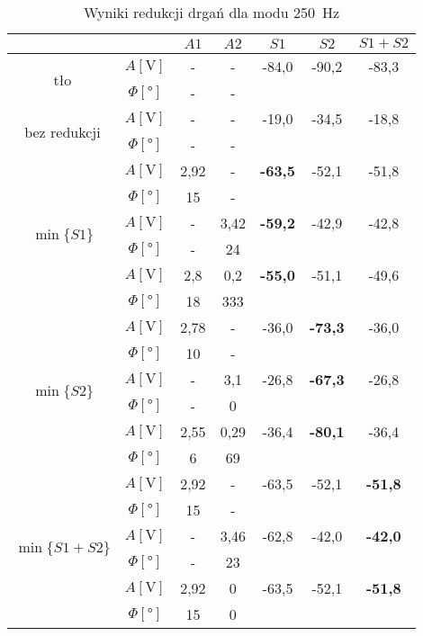 \documentclass[polish,a4paper,11pt]{mwart}
\begin{document}
\begin{table}[!tbh]
  \centering
  \caption{Wyniki redukcji drgań dla modu \SI{250}{\hertz}}
  \label{tab:red1}
  \begin{tabular}{|c|c|c|c|c|c|c|}
    \cline{3-7}
    \multicolumn{2}{c|}{}&$A1$&$A2$&$S1$&$S2$&$S1+S2$\\\hline
    \multirow{2}{*}{tło}               &   $A [\si{\V}]$ & - & - & -84,0 & -90,2 & -83,3 \\\cline{2-7}
				       &$\Phi [\si{\degree}]$ & - & - & \multicolumn{3}{c}{}\\\hline
    \multirow{2}{*}{bez redukcji} &   $A [\si{\V}]$ & - & - & -19,0 & -34,5 & -18,8 \\\cline{2-7}
				       &$\Phi [\si{\degree}]$ & - & - & \multicolumn{3}{c}{}\\\hline
    \multirow{6}{*}{$\min\{S1\}$}      &   $A [\si{\V}]$ & 2,92 & - & \textbf{-63,5} & -52,1 & -51,8 \\\cline{2-7}
				       &$\Phi [\si{\degree}]$ & 15 & - & \multicolumn{3}{c}{}\\\cline{2-7}
				       &   $A [\si{\V}]$ & - & 3,42 & \textbf{-59,2} & -42,9 & -42,8 \\\cline{2-7}
				       &$\Phi [\si{\degree}]$ & - & 24 & \multicolumn{3}{c}{}\\\cline{2-7}
				       &   $A [\si{\V}]$ & 2,8 & 0,2 & \textbf{-55,0} & -51,1 & -49,6 \\\cline{2-7}
				       &$\Phi [\si{\degree}]$ & 18 & 333 & \multicolumn{3}{c}{}\\\hline
    \multirow{6}{*}{$\min\{S2\}$}      &   $A [\si{\V}]$ & 2,78 & - & -36,0 & \textbf{-73,3} & -36,0\\\cline{2-7}
				       &$\Phi [\si{\degree}]$ & 10 & - & \multicolumn{3}{c}{}\\\cline{2-7}
				       &   $A [\si{\V}]$ & - & 3,1 & -26,8 & \textbf{-67,3} & -26,8 \\\cline{2-7}
				       &$\Phi [\si{\degree}]$ & - & 0 & \multicolumn{3}{c}{}\\\cline{2-7}
				       &   $A [\si{\V}]$ & 2,55 & 0,29 & -36,4 & \textbf{-80,1} & -36,4 \\\cline{2-7}
				       &$\Phi [\si{\degree}]$ & 6 & 69 & \multicolumn{3}{c}{}\\\hline
    \multirow{6}{*}{$\min\{S1+S2\}$}   &   $A [\si{\V}]$ & 2,92 & - & -63,5  & -52,1 & \textbf{-51,8}\\\cline{2-7}
				       &$\Phi [\si{\degree}]$ & 15 & - & \multicolumn{3}{c}{}\\\cline{2-7}
				       &   $A [\si{\V}]$ & - & 3,46 & -62,8 & -42,0 & \textbf{-42,0} \\\cline{2-7}
				       &$\Phi [\si{\degree}]$ & - & 23 & \multicolumn{3}{c}{}\\\cline{2-7}
				       &   $A [\si{\V}]$ & 2,92 & 0 & -63,5 & -52,1 & \textbf{-51,8} \\\cline{2-7}
				       &$\Phi [\si{\degree}]$ & 15 & 0 & \multicolumn{3}{c}{}\\\cline{1-4}
  \end{tabular}
\end{table}
\end{document}
